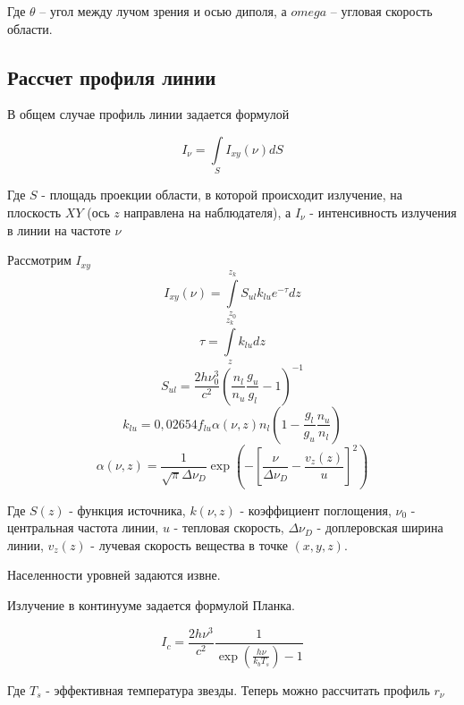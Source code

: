 \documentclass{article}
\begin{document}
Где $\theta$ -- угол между лучом зрения и осью диполя, а $omega$ -- угловая скорость области.

\subsection{Рассчет профиля линии}

В общем случае профиль линии задается формулой

\begin{equation}
I_{\nu} = \int \limits_{S} I_{xy}(\nu) dS
\end{equation}

Где $S$ - площадь проекции области, в которой происходит излучение, на плоскость $XY$ (ось $z$ направлена на наблюдателя), а $I_\nu$ - интенсивность излучения в линии  на частоте $\nu$ 

Рассмотрим $I_{xy}$
\begin{equation}
I_{xy}(\nu) =  \int \limits_{z_0}^{z_k} S_{ul}k_{lu}e^{-\tau}dz
\end{equation}
\begin{equation}
\tau = \int \limits_z^{z_k} k_{lu}dz
\end{equation}
\begin{equation}
S_{ul} = \frac{2h\nu_0^3}{c^2}\left(\frac{n_l}{n_u} \frac{g_u}{g_l} - 1 \right)^{-1}
\end{equation}
\begin{equation}
k_{lu} = 0,02654f_{lu}\alpha(\nu, z)n_l\left(1 - \frac{g_l}{g_u}\frac{n_u}{n_l}\right)
\end{equation}
\begin{equation}
\alpha(\nu, z) = \frac{1}{\sqrt{\pi} \Delta\nu_D} \exp\left( -\left[ \frac{\nu}{\Delta\nu_D} - \frac{v_z(z)}{u}\right]^2\right)
\end{equation}

Где $S(z)$ - функция источника, $k(\nu, z)$ - коэффициент поглощения, $\nu_0$ - центральная частота линии, $u$ - тепловая скорость, $\Delta\nu_D$ - доплеровская ширина линии, $v_z(z)$ - лучевая скорость вещества в точке $(x, y, z)$.

Населенности уровней задаются извне. 

Излучение в континууме задается формулой Планка.

\begin{equation}
I_c = \frac{2h\nu^3}{c^2}\frac{1}{\exp\left(\frac{h\nu}{k_bT_s}\right)-1}
\end{equation}

Где $T_s$ - эффективная температура звезды. Теперь можно рассчитать профиль $r_{\nu}$
\end{document}
